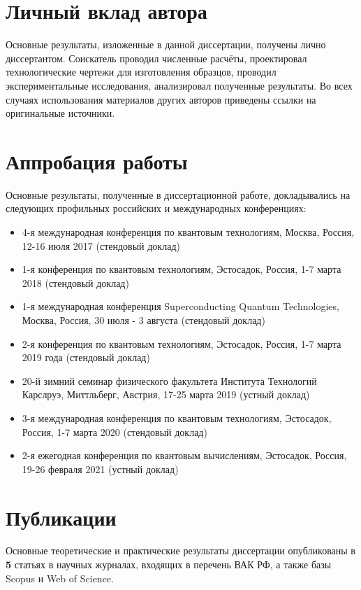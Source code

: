 \documentclass[14pt, a4paper]{extreport}
\numberwithin{equation}{section}
\begin{document}
\section*{Личный вклад автора}

Основные результаты, изложенные в данной диссертации, получены лично диссертантом. Соискатель проводил численные расчёты, проектировал технологические чертежи для изготовления образцов, проводил экспериментальные исследования, анализировал полученные результаты. Во всех случаях использования материалов других авторов приведены ссылки на оригинальные источники.

\section*{Аппробация работы}

Основные результаты, полученные в диссертационной работе, докладывались на следующих профильных российских и международных конференциях:
\begin{itemize}
	\item 4-я международная конференция по квантовым технологиям, Москва, Россия, 12-16 июля 2017 (стендовый доклад)
	\item 1-я конференция по квантовым технологиям, Эстосадок, Россия, 1-7 марта 2018 (стендовый доклад)
	\item 1-я международная конференция Superconducting Quantum Technologies, Москва, Россия, 30 июля - 3 августа (стендовый доклад)
	\item 2-я конференция по квантовым технологиям, Эстосадок, Россия, 1-7 марта 2019 года (стендовый доклад)
	\item 20-й зимний семинар физического факультета Института Технологий Карслруэ, Миттльберг, Австрия,  17-25 марта 2019 (устный доклад)
	\item 3-я международная конференция по квантовым технологиям, Эстосадок, Россия, 1-7 марта 2020 (стендовый доклад)
	\item 2-я ежегодная конференция по квантовым вычислениям, Эстосадок, Россия, 19-26 февраля 2021 (устный доклад)
\end{itemize}

\section*{Публикации}

Основные теоретические и практические результаты диссертации
опубликованы в \textbf{5} статьях в научных журналах, входящих в перечень ВАК
РФ, а также базы Scopus и Web of Science.
\end{document}
